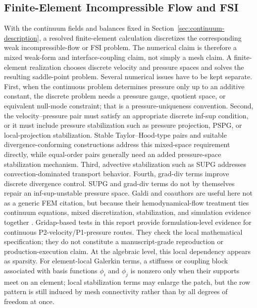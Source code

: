 \subsection{Finite-Element Incompressible Flow and FSI}
\label{subsec:numerical-methods-fem-fsi}

With the continuum fields and balances fixed in
Section~\ref{sec:continuum-description}, a resolved finite-element calculation
discretizes the corresponding weak incompressible-flow or FSI problem. The
numerical claim is therefore a mixed weak-form and interface-coupling claim, not
simply a mesh claim. A finite-element realization chooses discrete velocity and
pressure spaces and solves the resulting saddle-point problem. Several
numerical issues have to be kept separate. First, when the continuous
problem determines pressure only up to an additive constant, the discrete
problem needs a pressure gauge, quotient space, or equivalent null-mode
constraint; that is a pressure-uniqueness convention. Second, the
velocity--pressure pair must satisfy an appropriate discrete inf-sup condition,
or it must include pressure stabilization such as pressure projection, PSPG, or
local-projection stabilization. Stable Taylor--Hood-type pairs and suitable
divergence-conforming constructions address this mixed-space requirement
directly, while equal-order pairs generally need an added pressure-space
stabilization mechanism. Third, advective stabilization such as SUPG addresses
convection-dominated transport behavior. Fourth, grad-div terms improve
discrete divergence control. SUPG and grad-div terms do not by themselves
repair an inf-sup-unstable pressure space. Galdi and coauthors are useful here
not as a generic FEM citation, but because their hemodynamical-flow treatment
ties continuum equations, mixed discretization, stabilization, and simulation
evidence together \cite{GaldiEtAl2008HemodynamicalFlows}. Gridap-based tests in
this report provide formulation-level evidence for continuous
P2-velocity/P1-pressure routes. They check the local mathematical
specification; they do not constitute a manuscript-grade reproduction or
production-execution claim.
At the algebraic level, this local dependency appears as sparsity. For
element-local Galerkin terms, a stiffness or coupling block associated with
basis functions $\phi_i$ and $\phi_j$ is nonzero only when their supports meet
on an element; local stabilization terms may enlarge the patch, but the row
pattern is still induced by mesh connectivity rather than by all degrees of
freedom at once.

